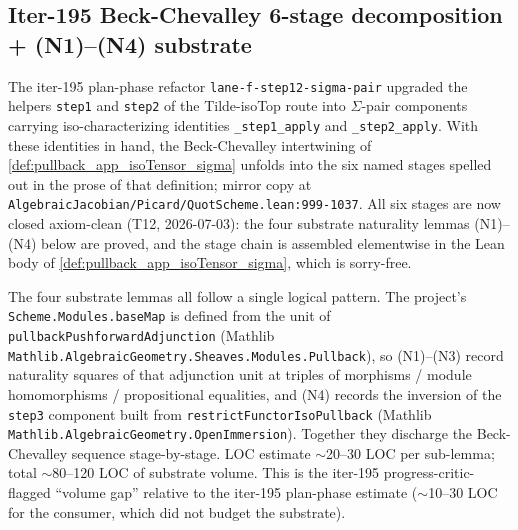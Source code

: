 \subsection{Iter-195 Beck-Chevalley 6-stage decomposition + (N1)--(N4) substrate}
\label{sec:quot_iter195_bc_substrate}

The iter-195 plan-phase refactor \texttt{lane-f-step12-sigma-pair}
upgraded the helpers \texttt{step1} and \texttt{step2} of the
Tilde-isoTop route into \(\Sigma\)-pair components carrying
iso-characterizing identities \texttt{\_step1\_apply} and
\texttt{\_step2\_apply}. With these identities in hand, the
Beck-Chevalley intertwining of
\cref{def:pullback_app_isoTensor_sigma} unfolds into the six named
stages spelled out in the prose of that definition; mirror copy at
\texttt{AlgebraicJacobian/Picard/QuotScheme.lean:999-1037}. All six
stages are now closed axiom-clean (T12, 2026-07-03): the four
substrate naturality lemmas (N1)--(N4) below are proved, and the
stage chain is assembled elementwise in the Lean body of
\cref{def:pullback_app_isoTensor_sigma}, which is sorry-free.

The four substrate lemmas all follow a single logical pattern. The
project's \texttt{Scheme.Modules.baseMap} is defined from the unit of
\texttt{pullbackPushforwardAdjunction} (Mathlib
\texttt{Mathlib.AlgebraicGeometry.Sheaves.Modules.Pullback}), so
(N1)--(N3) record naturality squares of that adjunction unit at
triples of morphisms / module homomorphisms / propositional
equalities, and (N4) records the inversion of the \texttt{step3}
component built from \texttt{restrictFunctorIsoPullback} (Mathlib
\texttt{Mathlib.AlgebraicGeometry.OpenImmersion}). Together they
discharge the Beck-Chevalley sequence stage-by-stage. LOC estimate
\(\sim\)20--30 LOC per sub-lemma; total \(\sim\)80--120 LOC of
substrate volume. This is the iter-195 progress-critic-flagged
``volume gap'' relative to the iter-195 plan-phase estimate
(\(\sim\)10--30 LOC for the consumer, which did not budget the
substrate).


